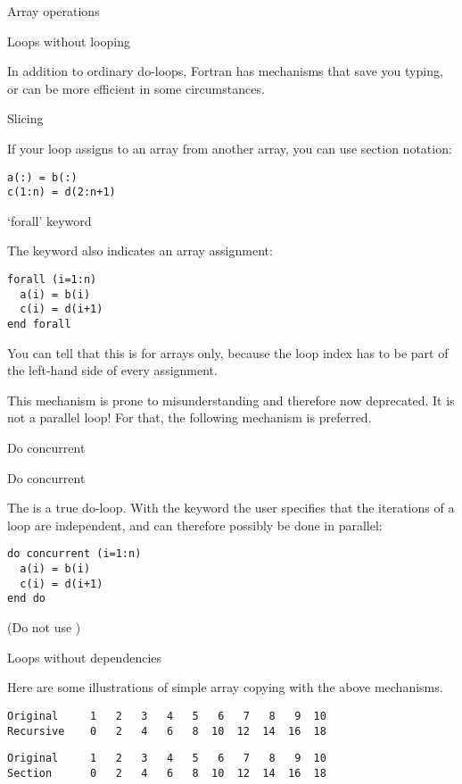  {Array operations}

 {Loops without looping}

In addition to ordinary do-loops, Fortran has mechanisms that save you
typing, or can be more efficient in some circumstances.

 {Slicing}

If your loop assigns to an array from another array,
  you can use section notation:
\begin{lstlisting}
a(:) = b(:)
c(1:n) = d(2:n+1)
\end{lstlisting}

 {`forall' keyword}

The  keyword also indicates an array assignment:
\begin{lstlisting}
forall (i=1:n)
  a(i) = b(i)
  c(i) = d(i+1)
end forall
\end{lstlisting}
You can tell that this is for arrays only, because the loop index has
to be part of the left-hand side of every assignment.

This mechanism is prone to misunderstanding and therefore now
deprecated.
It is not a parallel loop! For that, the following mechanism is preferred.

 {Do concurrent}

\begin{block}{Do concurrent}
  \label{sl:farray-concurrent}

  The  is a true do-loop. With the
   keyword the user specifies that the
  iterations of a loop are independent, and can therefore possibly be
  done in parallel:
\begin{lstlisting}
do concurrent (i=1:n)
  a(i) = b(i)
  c(i) = d(i+1)
end do
\end{lstlisting}
(Do not use )
\end{block}

 {Loops without dependencies}

Here are some illustrations of simple array copying with the above
mechanisms.

\begin{lstlisting}
Original     1   2   3   4   5   6   7   8   9  10
Recursive    0   2   4   6   8  10  12  14  16  18
\end{lstlisting}

\begin{lstlisting}
Original     1   2   3   4   5   6   7   8   9  10
Section      0   2   4   6   8  10  12  14  16  18
\end{lstlisting}

